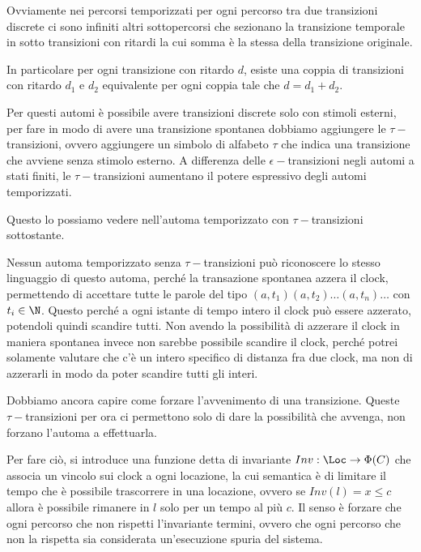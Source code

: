 
Ovviamente nei percorsi temporizzati per ogni percorso tra due transizioni discrete ci sono infiniti altri sottopercorsi che sezionano la transizione temporale in sotto transizioni con ritardi la cui somma è la stessa della transizione originale.

In particolare per ogni transizione con ritardo \(d\), esiste una coppia di transizioni con ritardo \(d_1\) e \(d_2\) equivalente per ogni coppia tale che \(d=d_1+d_2\).

Per questi automi è possibile avere transizioni discrete solo con stimoli esterni, per fare in modo di avere una transizione spontanea dobbiamo aggiungere le \(\tau-\)transizioni, ovvero aggiungere un simbolo di alfabeto \(\tau\) che indica una transizione che avviene senza stimolo esterno. A differenza delle \(\epsilon-\)transizioni negli automi a stati finiti, le \(\tau-\)transizioni aumentano il potere espressivo degli automi temporizzati.

Questo lo possiamo vedere nell'automa temporizzato con \(\tau-\)transizioni sottostante.

Nessun automa temporizzato senza \(\tau-\)transizioni può riconoscere lo stesso linguaggio di questo automa, perché la transazione spontanea azzera il clock, permettendo di accettare tutte le parole del tipo \((a,t_1)(a,t_2)\ldots(a,t_n)\ldots\) con \(t_i \in \N\). Questo perché a ogni istante di tempo intero il clock può essere azzerato, potendoli quindi scandire tutti. Non avendo la possibilità di azzerare il clock in maniera spontanea invece non sarebbe possibile scandire il clock, perché potrei solamente valutare che c'è un intero specifico di distanza fra due clock, ma non di azzerarli in modo da poter scandire tutti gli interi.

Dobbiamo ancora capire come forzare l'avvenimento di una transizione. Queste \(\tau-\)transizioni per ora ci permettono solo di dare la possibilità che avvenga, non forzano l'automa a effettuarla.

Per fare ciò, si introduce una funzione detta di invariante \(Inv: \Loc \to \Phi(C)\) che associa un vincolo sui clock a ogni locazione, la cui semantica è di limitare il tempo che è possibile trascorrere in una locazione, ovvero se \(Inv(l) = x \leq c\) allora è possibile rimanere in \(l\) solo per un tempo al più \(c\). Il senso è forzare che ogni percorso che non rispetti l'invariante termini, ovvero che ogni percorso che non la rispetta sia considerata un'esecuzione spuria del sistema.

